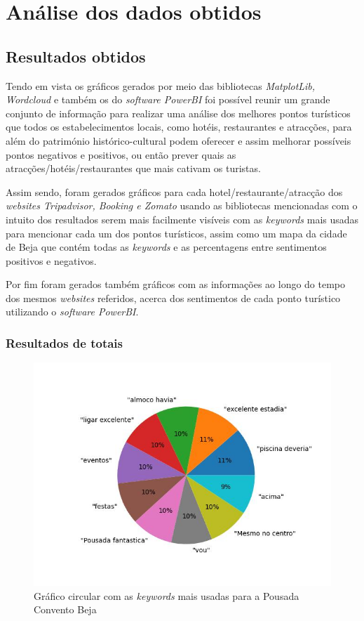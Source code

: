 \chapter{Análise dos dados obtidos}
\label{cap7}

\section{Resultados obtidos}

Tendo em vista os gráficos gerados por meio das bibliotecas \textit{MatplotLib, Wordcloud} \cite{gfg3} \cite{va1} e também os do \textit{software PowerBI}  foi possível reunir um grande conjunto de informação para realizar uma análise dos melhores pontos turísticos que todos os estabelecimentos locais, como hotéis, restaurantes e atracções, para além do património histórico-cultural podem oferecer e assim melhorar possíveis pontos negativos e positivos, ou então prever quais as atracções/hotéis/restaurantes que mais cativam os turistas.

Assim sendo, foram gerados gráficos para cada hotel/restaurante/atracção dos \textit{websites Tripadvisor, Booking e Zomato} usando as bibliotecas mencionadas com o intuito dos resultados serem mais facilmente visíveis com as \textit{keywords} mais usadas para mencionar cada um dos pontos turísticos, assim como um mapa da cidade de Beja que contém todas as \textit{keywords} e as percentagens entre sentimentos positivos e negativos.

Por fim foram gerados também gráficos com as informações ao longo do tempo dos mesmos \textit{websites} referidos, acerca dos sentimentos de cada ponto turístico utilizando o \textit{software PowerBI}.

\subsection{Resultados de totais}

\begin{figure}[!htb]
\centering
\includegraphics[width=14cm]{figuras/TripAdvisor/Hotels/hotel0_keywords.jpeg}
\caption{Gráfico circular com as \textit{keywords} mais usadas para a Pousada Convento Beja}
\label{fig:top10keywpcbeja}
\end{figure}

